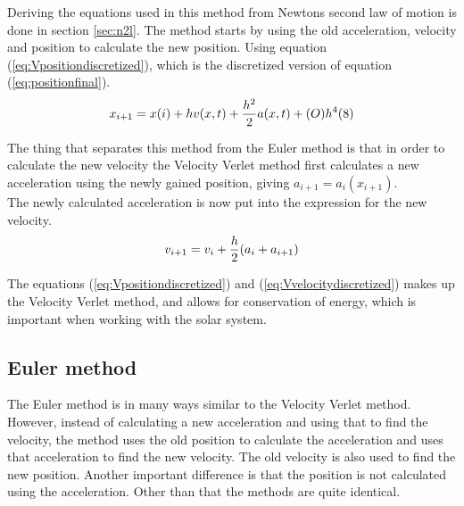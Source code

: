\documentclass{article}
\begin{document}
    Deriving the equations used in this method from Newtons second law of motion is done in section \ref{sec:n2l}. The method starts by using the old acceleration, velocity and position to calculate the new position. Using equation (\ref{eq:Vpositiondiscretized}), which is the discretized version of equation (\ref{eq:positionfinal}). \\

    \begin{equation}    \label{eq:Vpositiondiscretized}
        x_{i+1} = x(i) + h v(x,t) + \frac{h^{2}}{2} a(x,t) + (O)h^{4} (8)\\
    \end{equation}

    The thing that separates this method from the Euler method is that in order to calculate the new velocity the Velocity Verlet method first calculates a new acceleration using the newly gained position, giving $a_{i+1} = a_i (x_{i+1})$. \\

    The newly calculated acceleration is now put into the expression for the new velocity. \\

    \begin{equation}    \label{eq:Vvelocitydiscretized}
        v_{i+1} = v_i + \frac{h}{2} (a_i+a_{i+1})  \\
    \end{equation}

    The equations (\ref{eq:Vpositiondiscretized}) and (\ref{eq:Vvelocitydiscretized}) makes up the Velocity Verlet method, and allows for conservation of energy, which is important when working with the solar system. \\

\subsection{Euler method}

    The Euler method is in many ways similar to the Velocity Verlet method. However, instead of calculating a new acceleration and using that to find the velocity, the method uses the old position to calculate the acceleration and uses that acceleration to find the new velocity. The old velocity is also used to find the new position. Another important difference is that the position is not calculated using the acceleration. Other than that the methods are quite identical. \\
\end{document}
